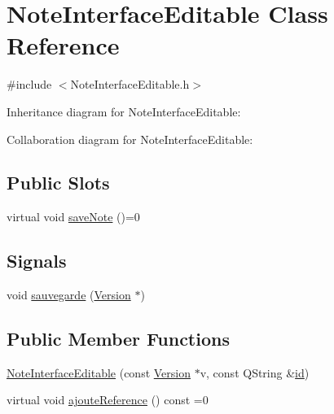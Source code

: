 \hypertarget{classNoteInterfaceEditable}{}\section{Note\+Interface\+Editable Class Reference}
\label{classNoteInterfaceEditable}


{\ttfamily \#include $<$Note\+Interface\+Editable.\+h$>$}



Inheritance diagram for Note\+Interface\+Editable\+:


Collaboration diagram for Note\+Interface\+Editable\+:
\subsection*{Public Slots}
\begin{DoxyCompactItemize}
\item 
virtual void \hyperlink{classNoteInterfaceEditable_a13a04828f0643a863b15262060b72405}{save\+Note} ()=0
\end{DoxyCompactItemize}
\subsection*{Signals}
\begin{DoxyCompactItemize}
\item 
void \hyperlink{classNoteInterfaceEditable_a0224487bebe20ba4c9970b32c8321dd6}{sauvegarde} (\hyperlink{classVersion}{Version} $\ast$)
\end{DoxyCompactItemize}
\subsection*{Public Member Functions}
\begin{DoxyCompactItemize}
\item 
\hyperlink{classNoteInterfaceEditable_aa01164a7c0fa76571dd4dfc8d2ffb4f0}{Note\+Interface\+Editable} (const \hyperlink{classVersion}{Version} $\ast$v, const Q\+String \&\hyperlink{classNoteInterfaceEditable_a644ed9be4e9882c784a2667748d8501d}{id})
\item 
virtual void \hyperlink{classNoteInterfaceEditable_aea381fd67569e04ed9d35a48df1c0f19}{ajoute\+Reference} () const =0
\end{DoxyCompactItemize}
